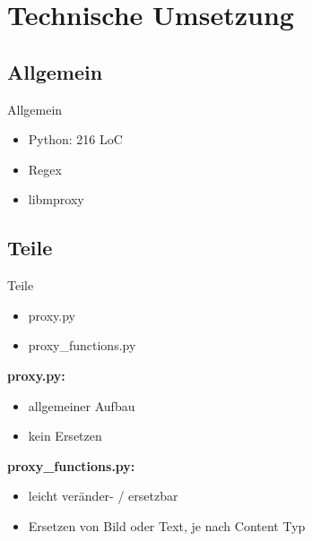 \documentclass [xcolor=dvipsnames] {beamer}
\begin{document}
\section{Technische Umsetzung}
\subsection{Allgemein}
\begin{frame}
	{\sc Allgemein}
	\begin{itemize}
		\item Python: 216 LoC
		\item Regex
		\item libmproxy
	\end{itemize}
\end{frame}

\subsection{Teile}
\begin{frame}
	{\sc Teile}
	\begin{itemize}
		\item proxy.py
		\item proxy\_functions.py
	\end{itemize}
\end{frame}
\note
{
	{\bf proxy.py:}
	\begin{itemize}
		\item allgemeiner Aufbau
		\item kein Ersetzen
	\end{itemize}
	{\bf proxy\_functions.py:}
	\begin{itemize}
		\item leicht veränder- / ersetzbar
		\item Ersetzen von Bild oder Text, je nach Content Typ
	\end{itemize}
}
\end{document}

